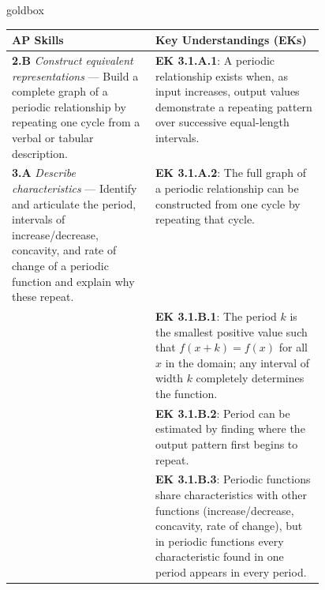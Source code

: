 \documentclass[10pt]{article}
\begin{document}
\begin{skillbox}{goldbox}
\begin{tabularx}{\linewidth}{@{} p{0.46\linewidth} X @{}}
\textbf{AP Skills} & \textbf{Key Understandings (EKs)} \\
\midrule
\textbf{2.B} \textit{Construct equivalent representations} ---
  Build a complete graph of a periodic relationship by repeating one cycle
  from a verbal or tabular description.
&
\textbf{EK 3.1.A.1}: A periodic relationship exists when, as input increases,
output values demonstrate a repeating pattern over successive equal-length
intervals. \\[4pt]

\textbf{3.A} \textit{Describe characteristics} ---
  Identify and articulate the period, intervals of increase/decrease,
  concavity, and rate of change of a periodic function and explain why
  these repeat.
&
\textbf{EK 3.1.A.2}: The full graph of a periodic relationship can be
constructed from one cycle by repeating that cycle. \\[4pt]

&
\textbf{EK 3.1.B.1}: The period $k$ is the smallest positive value such
that $f(x+k)=f(x)$ for all $x$ in the domain; any interval of width $k$
completely determines the function. \\[4pt]

&
\textbf{EK 3.1.B.2}: Period can be estimated by finding where the output
pattern first begins to repeat. \\[4pt]

&
\textbf{EK 3.1.B.3}: Periodic functions share characteristics with other
functions (increase/decrease, concavity, rate of change), but in periodic
functions every characteristic found in one period appears in every period. \\
\end{tabularx}
\end{skillbox}

\vspace{0.08in}
\end{document}
